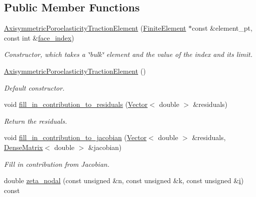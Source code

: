 \subsection*{Public Member Functions}
\begin{DoxyCompactItemize}
\item 
\hyperlink{classoomph_1_1AxisymmetricPoroelasticityTractionElement_aa640d489135a4daeb423a4f5ff3cf444}{Axisymmetric\+Poroelasticity\+Traction\+Element} (\hyperlink{classoomph_1_1FiniteElement}{Finite\+Element} $\ast$const \&element\+\_\+pt, const int \&\hyperlink{classoomph_1_1FaceElement_a478d577ac6db67ecc80f1f02ae3ab170}{face\+\_\+index})
\begin{DoxyCompactList}\small\item\em Constructor, which takes a \char`\"{}bulk\char`\"{} element and the value of the index and its limit. \end{DoxyCompactList}\item 
\hyperlink{classoomph_1_1AxisymmetricPoroelasticityTractionElement_a518070e49c32661dce27658f018b0986}{Axisymmetric\+Poroelasticity\+Traction\+Element} ()
\begin{DoxyCompactList}\small\item\em Default constructor. \end{DoxyCompactList}\item 
void \hyperlink{classoomph_1_1AxisymmetricPoroelasticityTractionElement_a0db1a4eba81137b3740fcbd7bc705f48}{fill\+\_\+in\+\_\+contribution\+\_\+to\+\_\+residuals} (\hyperlink{classoomph_1_1Vector}{Vector}$<$ double $>$ \&residuals)
\begin{DoxyCompactList}\small\item\em Return the residuals. \end{DoxyCompactList}\item 
void \hyperlink{classoomph_1_1AxisymmetricPoroelasticityTractionElement_a9779f0ccbce1f73b77c64b91ed9ebefa}{fill\+\_\+in\+\_\+contribution\+\_\+to\+\_\+jacobian} (\hyperlink{classoomph_1_1Vector}{Vector}$<$ double $>$ \&residuals, \hyperlink{classoomph_1_1DenseMatrix}{Dense\+Matrix}$<$ double $>$ \&jacobian)
\begin{DoxyCompactList}\small\item\em Fill in contribution from Jacobian. \end{DoxyCompactList}\item 
double \hyperlink{classoomph_1_1AxisymmetricPoroelasticityTractionElement_a8c215f2c9d8b8e66513397b102b1e4aa}{zeta\+\_\+nodal} (const unsigned \&n, const unsigned \&k, const unsigned \&\hyperlink{cfortran_8h_adb50e893b86b3e55e751a42eab3cba82}{i}) const

\end{DoxyCompactItemize}
